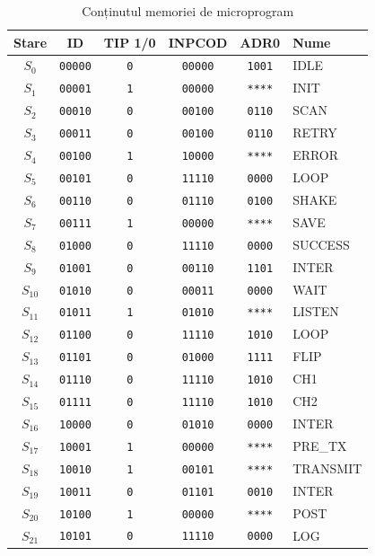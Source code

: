 \begin{table}[h]
\centering
\renewcommand{\arraystretch}{1.2}
\begin{tabular}{|c|c|c|c|c|l|}
\hline
\textbf{Stare} & \textbf{ID} & \textbf{TIP 1/0} & \textbf{INPCOD} & \textbf{ADR0} & \textbf{Nume} \\
\hline
$S_{0}$ & \texttt{00000} & \texttt{0} & \texttt{00000} & \texttt{1001} & IDLE \\
\hline
$S_{1}$ & \texttt{00001} & \texttt{1} & \texttt{00000} & \texttt{****} & INIT \\
\hline
$S_{2}$ & \texttt{00010} & \texttt{0} & \texttt{00100} & \texttt{0110} & SCAN \\
\hline
$S_{3}$ & \texttt{00011} & \texttt{0} & \texttt{00100} & \texttt{0110} & RETRY \\
\hline
$S_{4}$ & \texttt{00100} & \texttt{1} & \texttt{10000} & \texttt{****} & ERROR \\
\hline
$S_{5}$ & \texttt{00101} & \texttt{0} & \texttt{11110} & \texttt{0000} & LOOP \\
\hline
$S_{6}$ & \texttt{00110} & \texttt{0} & \texttt{01110} & \texttt{0100} & SHAKE \\
\hline
$S_{7}$ & \texttt{00111} & \texttt{1} & \texttt{00000} & \texttt{****} & SAVE \\
\hline
$S_{8}$ & \texttt{01000} & \texttt{0} & \texttt{11110} & \texttt{0000} & SUCCESS \\
\hline
$S_{9}$ & \texttt{01001} & \texttt{0} & \texttt{00110} & \texttt{1101} & INTER \\
\hline
$S_{10}$ & \texttt{01010} & \texttt{0} & \texttt{00011} & \texttt{0000} & WAIT \\
\hline
$S_{11}$ & \texttt{01011} & \texttt{1} & \texttt{01010} & \texttt{****} & LISTEN \\
\hline
$S_{12}$ & \texttt{01100} & \texttt{0} & \texttt{11110} & \texttt{1010} & LOOP \\
\hline
$S_{13}$ & \texttt{01101} & \texttt{0} & \texttt{01000} & \texttt{1111} & FLIP \\
\hline
$S_{14}$ & \texttt{01110} & \texttt{0} & \texttt{11110} & \texttt{1010} & CH1 \\
\hline
$S_{15}$ & \texttt{01111} & \texttt{0} & \texttt{11110} & \texttt{1010} & CH2 \\
\hline
$S_{16}$ & \texttt{10000} & \texttt{0} & \texttt{01010} & \texttt{0000} & INTER \\
\hline
$S_{17}$ & \texttt{10001} & \texttt{1} & \texttt{00000} & \texttt{****} & PRE\_TX \\
\hline
$S_{18}$ & \texttt{10010} & \texttt{1} & \texttt{00101} & \texttt{****} & TRANSMIT \\
\hline
$S_{19}$ & \texttt{10011} & \texttt{0} & \texttt{01101} & \texttt{0010} & INTER \\
\hline
$S_{20}$ & \texttt{10100} & \texttt{1} & \texttt{00000} & \texttt{****} & POST \\
\hline
$S_{21}$ & \texttt{10101} & \texttt{0} & \texttt{11110} & \texttt{0000} & LOG \\
\hline
\end{tabular}
\caption{Conținutul memoriei de microprogram}
\end{table}
